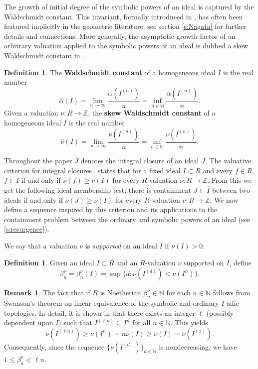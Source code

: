 \documentclass[12pt, reqno]{amsart}
\numberwithin{equation}{section}
\def\a{\ensuremath{\alpha}}
\newcommand{\N}{{\mathbb N}}
\newcommand{\Z}{{\mathbb Z}}
\theoremstyle{plain} %
\theoremstyle{definition}
\newtheorem{defn}[thm]{Definition}
\newtheorem{rem}[thm]{Remark}
\theoremstyle{remark}
\begin{document}
The growth of initial degree of the symbolic powers of an ideal is captured by the Waldschmidt constant. This invariant, formally introduced in \cite{BH10}, has often been featured implicitly in the geometric literature; see section \ref{s:Nagata} for further details and connections. More generally, the asymptotic growth factor of an arbitrary valuation applied to the symbolic powers of an ideal is  dubbed a skew Waldschmidt constant in~\cite{DFMS}.
  
 \begin{defn}
 \label{def:waldschmidt}
 The {\bf Waldschmidt constant} of a homogeneous ideal $I$ is the real number
 \[
 \widehat{\alpha}(I)=\lim_{n\to \infty}\frac{\alpha(I^{(n)})}{n}=\inf_{n\in\N} \frac{\alpha(I^{(n)})}{n}.
 \]
 Given a valuation $\nu:R\to \Z$, the {\bf skew Waldschmidt constant} of a homogeneous ideal $I$ is the real number
	\[
	\widehat{\nu}(I)=\lim_{n\to \infty}\frac{\nu(I^{(n)})}{n}=\inf_{n\in\N} \frac{\nu(I^{(n)})}{n}.
	\]
 \end{defn}
 
Throughout the paper $\overline{J}$ denotes the integral closure of an ideal $J$. The valuative criterion for integral closures~\cite[Theorem~6.8.3]{HS06} states that for a fixed ideal $I\subset R$ and every $f\in R$, $f\in \overline{I}$ if and only if $\nu(f)\ge \nu(I)$ for every $R$-valuation $\nu:R\to\Z$.  From this we get the following ideal membership test: there is containment $J\subset \overline{I}$ between two ideals if and only if $\nu(J)\ge \nu(I)$ for every $R$-valuation $\nu:R\to\Z$. 
We now define a sequence inspired by this criterion and its applications to the containment problem between the ordinary and symbolic powers of an ideal (see \cref{s:resurgence}). 

We say that a valuation $\nu$ is \textit{supported} on an ideal $I$ if $\nu(I)>0$.  
\begin{defn}
\label{def:betanu}
Given an ideal $I\subset R$ and an $R$-valuation $\nu$ supported on $I$, define
\[
\beta^{\nu}_n=\beta^{\nu}_n(I)=\sup\{d:\nu(I^{(d)}) < \nu(I^n)\}.
\]
\end{defn}

\begin{rem}
The fact that if $R$ is Noetherian $\beta^{\nu}_n\in\N$ for each $n\in\N$ follows from Swanson's theorem on linear equivalence of the symbolic and ordinary $I$-adic topologies. In detail, it is shown in  \cite{Swanson}  that there exists an integer $\ell$ (possibly dependent upon $I$) such that $I^{(\ell n)}\subseteq I^n$ for all $n\in \N$. This yields 
\[
\nu(I^{(\ell n)})\geq \nu(I^n) =n\nu(I) \geq \nu(I)=\nu(I^{(1)}).
\]
Consequently, since the sequence $\{\nu(I^{(d)})\}_{d\in\N}$ is nondecreasing, we have $1\leq \beta^{\nu}_n< \ell n$.
\end{rem}
\end{document}
